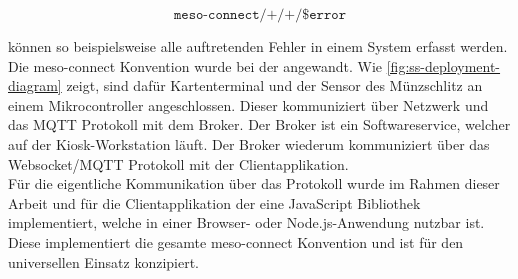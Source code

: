 \[\texttt{meso-connect/+/+/\$error} \]

können so beispielsweise alle auftretenden Fehler in einem System erfasst werden.\\

Die meso-connect Konvention wurde bei der \shst{} angewandt. Wie \autoref{fig:ss-deployment-diagram} zeigt,
sind dafür Kartenterminal und der Sensor des Münzschlitz an einem Mikrocontroller angeschlossen. Dieser
kommuniziert über Netzwerk und das MQTT Protokoll mit dem Broker. Der Broker ist ein Softwareservice,
welcher auf der Kiosk-Workstation läuft. Der Broker wiederum kommuniziert über das Websocket/MQTT Protokoll
mit der Clientapplikation.\\
Für die eigentliche Kommunikation über das Protokoll wurde im Rahmen dieser Arbeit und für die Clientapplikation 
der \shst{} eine JavaScript Bibliothek implementiert, welche in einer Browser- oder Node.js-Anwendung
nutzbar ist. Diese implementiert die gesamte meso-connect Konvention und ist für den universellen Einsatz
konzipiert. 

\iffalse
- Kartenterminal und der Sensor des Münzschlitz sind an einen Mikrocontroller angeschlossen. 
- Mikrocontroller kommuniziert über Netzwerk und das MQTT Protokoll mit dem Broker
- Broker ist ein Softwareservice welcher auf der Workstation läuft
- Die Clientapplikation kommuniziert über das MQTT/Websocket Protokoll mit dem Broker
- Konfigurationsfile, Beispiel der JS Bib 
- JS API Dokumentation in den Anhang
\fi